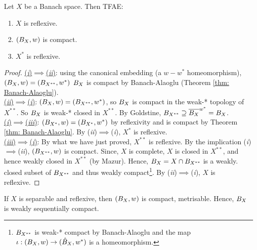 \documentclass{article}
\begin{document}
\begin{theorem}\label{thm: characterisation of reflexivity in terms of weak compactness of unit ball}
    Let $X$ be a Banach space. Then TFAE:
    \begin{enumerate}[label = (\roman*), align = left]
        \item $X$ is reflexive.
        \item $(B_{X}, w)$ is compact.
        \item $X^*$ is reflexive.
    \end{enumerate}
\end{theorem}

\begin{proof}
    \noindent\underline{(\textit{i})$\implies$(\textit{ii})}: using the canonical embedding (a $w-w^*$ homeomorphism), $(B_{X},w)=(B_{X^{**}},w^*)$ $B_{X}$ is compact by Banach-Alaoglu (Theorem \ref{thm: Banach-Alaoglu}).\\

    \noindent\underline{(\textit{ii})$\implies$(\textit{i})}: $(B_{X},w) = (B_{X^{**}},w^*)$, so $B_{X}$ is compact in the weak-* topology of $X^{**}$. So $B_{X}$ is weak-* closed in $X^{**}$. By Goldstine, $B_{X^{**}}\supseteq \overline{B_{X}}^{w^*}=B_{X}$.\\

    \noindent\underline{(\textit{i})$\implies$(\textit{iii})}: $(B_{X^*},w) = (B_{X^*},w^*)$ by reflexivity and is compact by Theorem \ref{thm: Banach-Alaoglu}. By (\textit{ii})$\implies$(\textit{i}), $X^*$ is reflexive. \\

    \noindent\underline{(\textit{iii})$\implies$(\textit{i})}: By what we have just proved, $X^{**}$ is reflexive. By the implication (\textit{i})$\implies$(\textit{ii}), $(B_{X^{**}},w)$ is compact. Since, $X$ is complete, $X$ is closed in $X^{**}$, and hence weakly closed in $X^{**}$ (by Mazur). Hence, $B_{X}=X\cap B_{X^{**}}$ is a weakly. closed subset of $B_{X^{**}}$ and thus weakly compact\footnote{$B_{X^{**}}$ is weak-* compact by Banach-Alaoglu and the map $\iota: (B_{X},w)\to (\hat{B}_X,w^*)$ is a homeomorphism.}. By (\textit{ii})$\implies$(\textit{i}), $X$ is reflexive.
\end{proof}

\begin{remark}
    If $X$ is separable and reflexive, then $(B_{X},w)$ is compact, metrisable. Hence, $B_{X}$ is weakly sequentially compact.
\end{remark}
\end{document}
